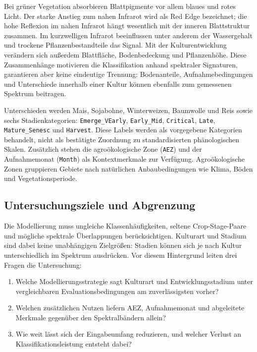 \documentclass[11pt,a4paper,titlepage]{article}
\begin{document}
Bei gr\"uner Vegetation absorbieren Blattpigmente vor allem blaues und rotes
Licht. Der starke Anstieg zum nahen Infrarot wird als Red Edge bezeichnet;
die hohe Reflexion im nahen Infrarot h\"angt wesentlich mit der inneren
Blattstruktur zusammen. Im kurzwelligen Infrarot
beeinflussen unter anderem der Wassergehalt und trockene Pflanzenbestandteile
das Signal. Mit der Kulturentwicklung ver\"andern sich au\ss erdem Blattfl\"ache,
Bodenbedeckung und Pflanzenh\"ohe. Diese Zusammenh\"ange
motivieren die Klassifikation anhand spektraler Signaturen, garantieren aber
keine eindeutige Trennung: Bodenanteile, Aufnahmebedingungen und Unterschiede
innerhalb einer Kultur k\"onnen ebenfalls zum gemessenen Spektrum beitragen.

Unterschieden werden Mais, Sojabohne, Winterweizen, Baumwolle und Reis sowie
sechs Stadienkategorien: \texttt{Emerge\_VEarly}, \texttt{Early\_Mid},
\texttt{Critical}, \texttt{Late}, \texttt{Mature\_Senesc} und \texttt{Harvest}.
Diese Labels werden als vorgegebene Kategorien behandelt, nicht als
best\"atigte Zuordnung zu standardisierten ph\"anologischen Skalen.
Zus\"atzlich stehen die agro\"okologische Zone (\texttt{AEZ}) und der
Aufnahmemonat (\texttt{Month}) als Kontextmerkmale zur Verf\"ugung.
Agro\"okologische Zonen gruppieren Gebiete nach nat\"urlichen Anbaubedingungen
wie Klima, B\"oden und Vegetationsperiode.

\subsection{Untersuchungsziele und Abgrenzung}

Die Modellierung muss ungleiche Klassenh\"aufigkeiten, seltene
Crop-Stage-Paare und m\"ogliche spektrale \"Uberlappungen ber\"ucksichtigen.
Kulturart und Stadium sind dabei keine unabh\"angigen Zielgr\"o\ss en:
Stadien k\"onnen sich je nach Kultur unterschiedlich im Spektrum ausdr\"ucken.
Vor diesem Hintergrund leiten drei Fragen die Untersuchung:

\begin{enumerate}
	\item Welche Modellierungsstrategie sagt Kulturart und Entwicklungsstadium
		unter vergleichbaren Evaluationsbedingungen am zuverl\"assigsten vorher?
	\item Welchen zus\"atzlichen Nutzen liefern AEZ, Aufnahmemonat und
		abgeleitete Merkmale gegen\"uber den Spektralb\"andern allein?
	\item Wie weit l\"asst sich der Eingabeumfang reduzieren, und welcher
		Verlust an Klassifikationsleistung entsteht dabei?
\end{enumerate}
\end{document}

